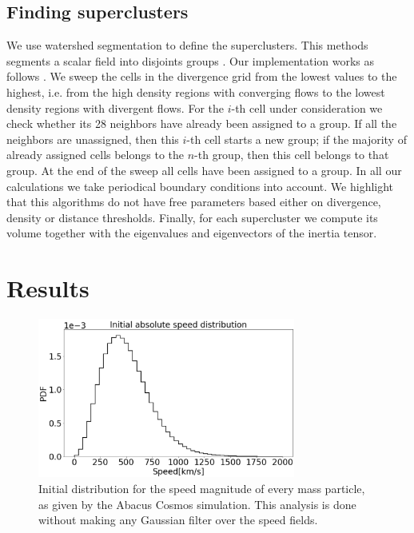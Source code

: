 \documentclass[usenatbib]{mnras}
\begin{document}
\subsection{Finding superclusters}
\label{sec:INTROWatershed}

We use watershed segmentation to define the superclusters.
This methods segments a scalar field into disjoints groups \citep{BeucherWatershed1979}.
Our implementation works as follows . 
We sweep the cells in the divergence grid from the lowest values to the highest, i.e. from
the high density regions with converging flows to the lowest density regions with divergent
flows.
For the $i$-th cell under consideration we check whether its 28 neighbors have already been assigned to a group. 
If all the neighbors are unassigned, then this $i$-th cell starts a new group; if the majority of already assigned cells belongs to the $n$-th group, then this cell belongs to that group. 
At the end of the sweep all cells have been assigned to a group.
In all our calculations we take periodical boundary conditions into account. 
We highlight that this algorithms do not have free parameters based either on divergence, density or distance thresholds.
Finally, for each supercluster we compute its volume together with the eigenvalues and eigenvectors of the inertia tensor.


\section{Results}




\begin{figure}
    \centering
    \includegraphics[width=240pt]{initial_distribution.pdf}
    \caption{Initial distribution for the speed magnitude of every mass particle, as given by the Abacus Cosmos simulation. This analysis is done without making any Gaussian filter over the speed fields.}
    \label{fig:initial_distribution}
\end{figure}
\end{document}
